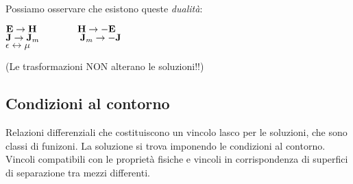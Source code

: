 \documentclass[a4paper]{article}
\begin{document}
Possiamo osservare che esistono queste \emph{dualità}:
\begin{center}
$\textbf{E}\rightarrow\textbf{H}\hspace{15mm}\textbf{H}\rightarrow -\textbf{E}$\\
$\textbf{J}\rightarrow\textbf{J}_m\hspace{15mm}\textbf{J}_m\rightarrow -\textbf{J}$\\
$\epsilon\longleftrightarrow\mu$\\
\end{center}
(Le trasformazioni NON alterano le soluzioni!!)\\
\subsection*{Condizioni al contorno}
Relazioni differenziali che costituiscono un vincolo lasco per le soluzioni, che sono classi di funizoni. La soluzione si trova imponendo le condizioni al contorno. Vincoli compatibili con le proprietà fisiche e vincoli in corrispondenza di superfici di separazione tra mezzi differenti.\\\\
\end{document}
